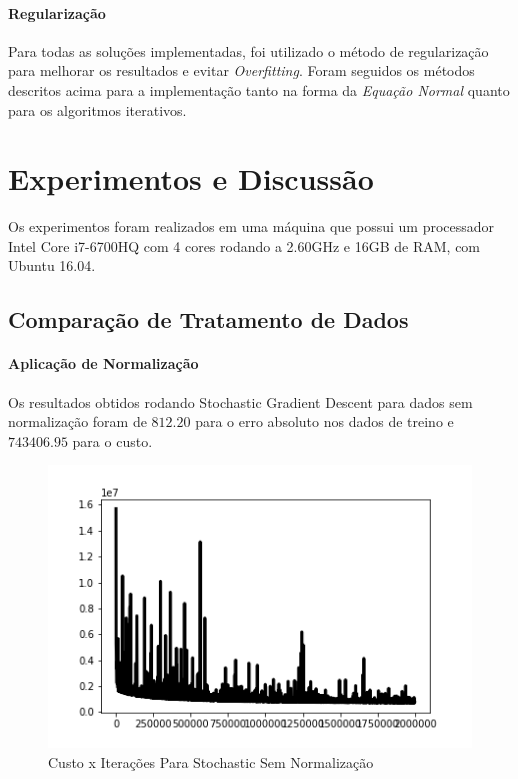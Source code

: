 \documentclass[conference]{IEEEtran}
\begin{document}
\paragraph{Regularização}

Para todas as soluções implementadas, foi utilizado o método de regularização para melhorar os resultados e evitar \textit{Overfitting}. Foram seguidos os métodos descritos acima para a implementação tanto na forma da \textit{Equação Normal} quanto para os algoritmos iterativos.

\section{Experimentos e Discussão}

Os experimentos foram realizados em uma máquina que possui um processador Intel Core i7-6700HQ com 4 cores rodando a 2.60GHz e 16GB de RAM, com Ubuntu 16.04.

\subsection{Comparação de Tratamento de Dados}

\paragraph{Aplicação de Normalização}

Os resultados obtidos rodando Stochastic Gradient Descent para dados sem normalização foram de $812.20$ para o erro absoluto nos dados de treino e $743406.95$ para o custo.

\begin{figure}[H]
  \includegraphics[width=\linewidth]{gfx/S_costitr_mitr2000000_nonnormalized.png}
  \caption{Custo x Iterações Para Stochastic Sem Normalização}
  \label{fig:not_normalized}
\end{figure}
\end{document}
